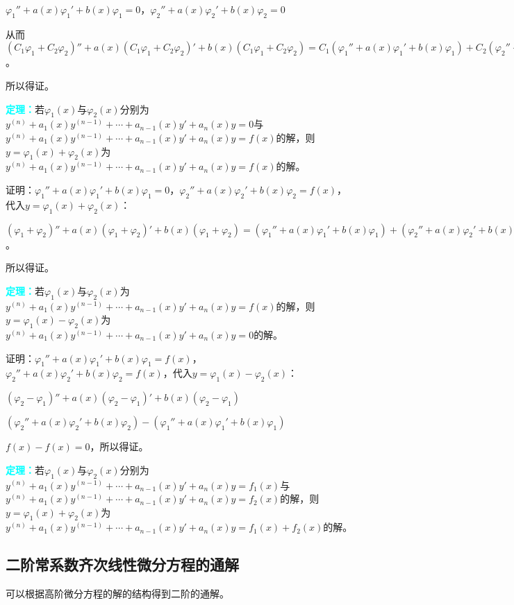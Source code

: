 \documentclass[UTF8, 12pt]{ctexart}
\begin{document}
$\varphi_1''+a(x)\varphi_1'+b(x)\varphi_1=0$，$\varphi_2''+a(x)\varphi_2'+b(x)\varphi_2=0$

从而$(C_1\varphi_1+C_2\varphi_2)''+a(x)(C_1\varphi_1+C_2\varphi_2)'+b(x)(C_1\varphi_1+C_2\varphi_2)=C_1(\varphi_1''+a(x)\varphi_1'+b(x)\varphi_1)+C_2(\varphi_2''+a(x)\varphi_2'+b(x)\varphi_2)=0$。

所以得证。

\textcolor{aqua}{\textbf{定理：}}若$\varphi_1(x)$与$\varphi_2(x)$分别为$y^{(n)}+a_1(x)y^{(n-1)}+\cdots+a_{n-1}(x)y'+a_n(x)y=0$与$y^{(n)}+a_1(x)y^{(n-1)}+\cdots+a_{n-1}(x)y'+a_n(x)y=f(x)$的解，则$y=\varphi_1(x)+\varphi_2(x)$为$y^{(n)}+a_1(x)y^{(n-1)}+\cdots+a_{n-1}(x)y'+a_n(x)y=f(x)$的解。

证明：$\varphi_1''+a(x)\varphi_1'+b(x)\varphi_1=0$，$\varphi_2''+a(x)\varphi_2'+b(x)\varphi_2=f(x)$，代入$y=\varphi_1(x)+\varphi_2(x)$：

$(\varphi_1+\varphi_2)''+a(x)(\varphi_1+\varphi_2)'+b(x)(\varphi_1+\varphi_2)=(\varphi_1''+a(x)\varphi_1'+b(x)\varphi_1)+(\varphi_2''+a(x)\varphi_2'+b(x)\varphi_2)=f(x)$。

所以得证。

\textcolor{aqua}{\textbf{定理：}}若$\varphi_1(x)$与$\varphi_2(x)$为$y^{(n)}+a_1(x)y^{(n-1)}+\cdots+a_{n-1}(x)y'+a_n(x)y=f(x)$的解，则$y=\varphi_1(x)-\varphi_2(x)$为$y^{(n)}+a_1(x)y^{(n-1)}+\cdots+a_{n-1}(x)y'+a_n(x)y=0$的解。

证明：$\varphi_1''+a(x)\varphi_1'+b(x)\varphi_1=f(x)$，$\varphi_2''+a(x)\varphi_2'+b(x)\varphi_2=f(x)$，代入$y=\varphi_1(x)-\varphi_2(x)$：

$(\varphi_2-\varphi_1)''+a(x)(\varphi_2-\varphi_1)'+b(x)(\varphi_2-\varphi_1)$

$(\varphi_2''+a(x)\varphi_2'+b(x)\varphi_2)-(\varphi_1''+a(x)\varphi_1'+b(x)\varphi_1)$

$f(x)-f(x)=0$，所以得证。

\textcolor{aqua}{\textbf{定理：}}若$\varphi_1(x)$与$\varphi_2(x)$分别为$y^{(n)}+a_1(x)y^{(n-1)}+\cdots+a_{n-1}(x)y'+a_n(x)y=f_1(x)$与$y^{(n)}+a_1(x)y^{(n-1)}+\cdots+a_{n-1}(x)y'+a_n(x)y=f_2(x)$的解，则$y=\varphi_1(x)+\varphi_2(x)$为$y^{(n)}+a_1(x)y^{(n-1)}+\cdots+a_{n-1}(x)y'+a_n(x)y=f_1(x)+f_2(x)$的解。

\subsection{二阶常系数齐次线性微分方程的通解}

可以根据高阶微分方程的解的结构得到二阶的通解。
\end{document}
